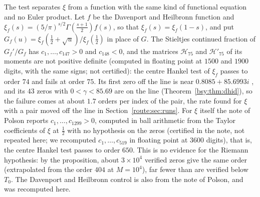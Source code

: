 The test separates $\xi$ from a function with the same kind of functional equation and no Euler product. Let $f$ be the Davenport and Heilbronn function \cite{DH36} and $\xi_f(s)=(5/\pi)^{s/2}\Gamma(\frac{s+1}2)f(s)$, so that $\xi_f(s)=\xi_f(1-s)$, and put $G_f(u)=\xi_f(\frac12+\sqrt u)/\xi_f(\frac12)$ in place of $G$. The Stieltjes continued fraction of $G_f'/G_f$ has $c_1,\dots,c_{147}>0$ and $c_{148}<0$, and the matrices $\mathcal H_{75}$ and $\mathcal H'_{75}$ of its moments are not positive definite (computed in floating point at $1500$ and $1900$ digits, with the same signs; not certified): the centre Hankel test of $\xi_f$ passes to order $74$ and fails at order $75$. Its first zero off the line is near $0.8085+85.6993i$ \cite{Spira94,BSO07}, and its $43$ zeros with $0<\gamma<85.69$ are on the line (Theorem~\ref{bsy:thm:dhid}), so the failure comes at about $1.7$ orders per index of the pair, the rate found for $\xi$ with a pair moved off the line in Section~\ref{route:sec:runs}. For $\xi$ itself the note of Polson reports $c_1,\dots,c_{1299}>0$, computed in ball arithmetic from the Taylor coefficients of $\xi$ at $\frac12$ with no hypothesis on the zeros (certified in the note, not repeated here; we recomputed $c_1,\dots,c_{519}$ in floating point at $3600$ digits), that is, the centre Hankel test passes to order $650$. This is no evidence for the Riemann hypothesis: by the proposition, about $3\times10^4$ verified zeros give the same order (extrapolated from the order $404$ at $M=10^4$), far fewer than are verified below $T_0$. The Davenport and Heilbronn control is also from the note of Polson, and was recomputed here.

